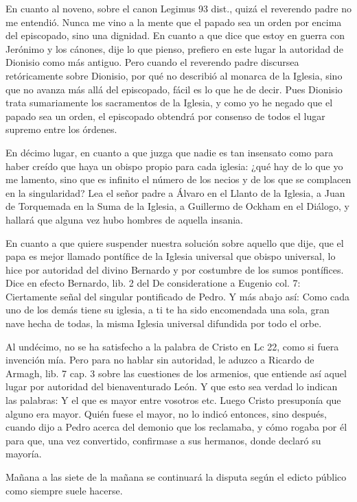 En cuanto al noveno, sobre el canon Legimus 93 dist., quizá el reverendo padre no me entendió. Nunca me vino a la mente que el papado sea un orden por encima del episcopado, sino una dignidad. En cuanto a que dice que estoy en guerra con Jerónimo y los cánones, dije lo que pienso, prefiero en este lugar la autoridad de Dionisio como más antiguo. Pero cuando el reverendo padre discursea retóricamente sobre Dionisio, por qué no describió al monarca de la Iglesia, sino que no avanza más allá del episcopado, fácil es lo que he de decir. Pues Dionisio trata sumariamente los sacramentos de la Iglesia, y como yo he negado que el papado sea un orden, el episcopado obtendrá por consenso de todos el lugar supremo entre los órdenes.

En décimo lugar, en cuanto a que juzga que nadie es tan insensato como para haber creído que haya un obispo propio para cada iglesia: ¿qué hay de lo que yo me lamento, sino que es infinito el número de los necios y de los que se complacen en la singularidad? Lea el señor padre a Álvaro en el Llanto de la Iglesia, a Juan de Torquemada en la Suma de la Iglesia, a Guillermo de Ockham en el Diálogo, y hallará que alguna vez hubo hombres de aquella insania.

En cuanto a que quiere suspender nuestra solución sobre aquello que dije, que el papa es mejor llamado pontífice de la Iglesia universal que obispo universal, lo hice por autoridad del divino Bernardo y por costumbre de los sumos pontífices. Dice en efecto Bernardo, lib. 2 del De consideratione a Eugenio col. 7: Ciertamente señal del singular pontificado de Pedro. Y más abajo así: Como cada uno de los demás tiene su iglesia, a ti te ha sido encomendada una sola, gran nave hecha de todas, la misma Iglesia universal difundida por todo el orbe.

Al undécimo, no se ha satisfecho a la palabra de Cristo en Lc 22, como si fuera invención mía. Pero para no hablar sin autoridad, le aduzco a Ricardo de Armagh, lib. 7 cap. 3 sobre las cuestiones de los armenios, que entiende así aquel lugar \marginpar{\small[271]} por autoridad del bienaventurado León. Y que esto sea verdad lo indican las palabras: Y el que es mayor entre vosotros etc. Luego Cristo presuponía que alguno era mayor. Quién fuese el mayor, no lo indicó entonces, sino después, cuando dijo a Pedro acerca del demonio que los reclamaba, y cómo rogaba por él para que, una vez convertido, confirmase a sus hermanos, donde declaró su mayoría.

Mañana a las siete de la mañana se continuará la disputa según el edicto público como siempre suele hacerse.

